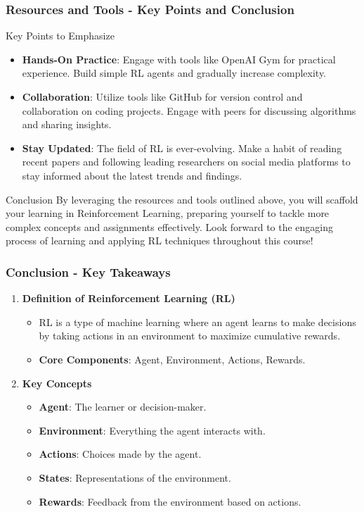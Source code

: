 \documentclass[aspectratio=169]{beamer}
\begin{document}
\begin{frame}[fragile]
    \frametitle{Resources and Tools - Key Points and Conclusion}
    \begin{block}{Key Points to Emphasize}
        \begin{itemize}
            \item \textbf{Hands-On Practice}: Engage with tools like OpenAI Gym for practical experience. Build simple RL agents and gradually increase complexity.
            \item \textbf{Collaboration}: Utilize tools like GitHub for version control and collaboration on coding projects. Engage with peers for discussing algorithms and sharing insights.
            \item \textbf{Stay Updated}: The field of RL is ever-evolving. Make a habit of reading recent papers and following leading researchers on social media platforms to stay informed about the latest trends and findings.
        \end{itemize}
    \end{block}
    \begin{block}{Conclusion}
        By leveraging the resources and tools outlined above, you will scaffold your learning in Reinforcement Learning, preparing yourself to tackle more complex concepts and assignments effectively. Look forward to the engaging process of learning and applying RL techniques throughout this course!
    \end{block}
\end{frame}

\begin{frame}[fragile]
    \frametitle{Conclusion - Key Takeaways}
    \begin{enumerate}
        \item \textbf{Definition of Reinforcement Learning (RL)}
        \begin{itemize}
            \item RL is a type of machine learning where an agent learns to make decisions by taking actions in an environment to maximize cumulative rewards.
            \item \textbf{Core Components}: Agent, Environment, Actions, Rewards.
        \end{itemize}

        \item \textbf{Key Concepts}
        \begin{itemize}
            \item \textbf{Agent}: The learner or decision-maker.
            \item \textbf{Environment}: Everything the agent interacts with.
            \item \textbf{Actions}: Choices made by the agent.
            \item \textbf{States}: Representations of the environment.
            \item \textbf{Rewards}: Feedback from the environment based on actions.
        \end{itemize}
    \end{enumerate}
\end{frame}
\end{document}
